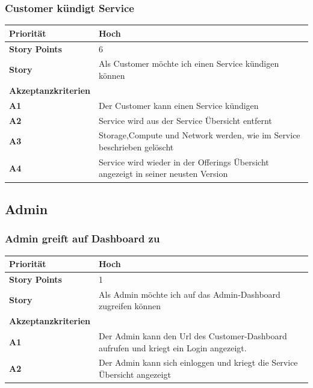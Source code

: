 \documentclass[11pt]{scrartcl}
\begin{document}
 \subsubsection{Customer kündigt Service}
 \begin{tabularx}{\linewidth}{l X}
     \textbf{Priorität} & Hoch\\
  \hline
  \textbf{Story Points} & 6\\
  \hline
  \textbf{Story}& Als Customer möchte ich einen Service kündigen können\\
  \hline
    \textbf{Akzeptanzkriterien} & \\
    \hline
  \textbf{A1} & Der Customer kann einen Service kündigen\\
  \hline
  \textbf{A2} & Service wird aus der Service Übersicht entfernt\\
  \hline
    \textbf{A3} & Storage,Compute und Network werden, wie im Service beschrieben gelöscht\\
  \hline
      \textbf{A4} & Service wird wieder in der Offerings Übersicht angezeigt in seiner neusten Version\\
  \hline
   \end{tabularx}
  
 \subsection{Admin}
 \subsubsection{Admin greift auf Dashboard zu}
\begin{tabularx}{\linewidth}{l X}
  \textbf{Priorität} & Hoch\\
  \hline
  \textbf{Story Points} & 1\\
  \hline
  \textbf{Story}& Als Admin möchte ich auf das Admin-Dashboard zugreifen können\\
  \hline
    \textbf{Akzeptanzkriterien} & \\
    \hline
  \textbf{A1} & Der Admin kann den Url des Customer-Dashboard aufrufen und 
  kriegt ein Login angezeigt.\\
  \hline
  \textbf{A2} & Der Admin kann sich einloggen und kriegt die Service Übersicht angezeigt\\
  \hline
 \end{tabularx}
 
 
\end{document}
